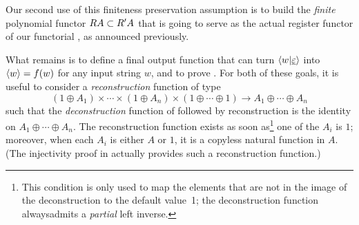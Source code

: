 Our second use of this finiteness preservation assumption is to build the
\emph{finite} polynomial functor $\functorr A \subset \functorr' A$ that is
going to serve as the actual register functor of our functorial \sst, as announced
previously.
\tito{}

What remains is to define a final output function that can turn
$\langle w|\underline\varepsilon \rangle$ into $\langle w \rangle = f(w)$ for any input string
$w$, and to prove . For both of these
goals, it is useful to consider a \emph{reconstruction} function of type
\[ (1 \oplus A_1) \times \cdots \times (1 \oplus A_n) \times (1 \oplus \cdots
  \oplus 1) \to A_1 \oplus \cdots \oplus A_n \] such that the
\emph{deconstruction} function of  followed by reconstruction is
the identity on $A_1 \oplus \cdots \oplus A_n$. The reconstruction function
exists as soon as\footnote{This condition is only used to map the elements that
  are not in the image of the deconstruction to the default value~1; the
  deconstruction function alwaysadmits a \emph{partial} left inverse.} one of
the $A_i$ is $1$; moreover, when each $A_i$ is either $A$ or $1$, it is a
copyless natural function in $A$. (The injectivity proof in 
actually provides such a reconstruction function.)


